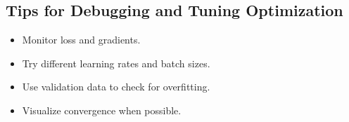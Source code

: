 \documentclass{article}
\begin{document}
\subsection{Tips for Debugging and Tuning Optimization}
\begin{itemize}
    \item Monitor loss and gradients.
    \item Try different learning rates and batch sizes.
    \item Use validation data to check for overfitting.
    \item Visualize convergence when possible.
\end{itemize}
\end{document}
